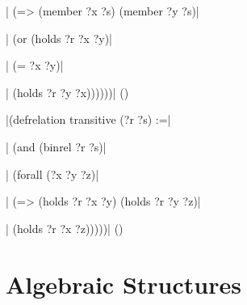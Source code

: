 \verbatim|         (=> (member ?x ?s) (member ?y ?s)|\par
\verbatim|             (or (holds ?r ?x ?y)|\par
\verbatim|                 (= ?x ?y)|\par
\verbatim|                 (holds ?r ?y ?x))))))|
\hfill(\equation)\par
\bigskip
\verbatim|(defrelation transitive (?r ?s) :=|\par
\verbatim|  (and (binrel ?r ?s)|\par
\verbatim|       (forall (?x ?y ?z)|\par
\verbatim|         (=> (holds ?r ?x ?y) (holds ?r ?y ?z)|\par
\verbatim|             (holds ?r ?x ?z)))))|
\hfill(\equation)\par
\bigskip

\section{Algebraic Structures}

